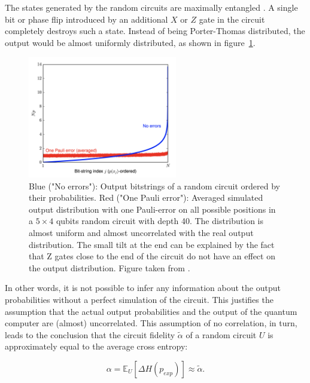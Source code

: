 The states generated by the random circuits are
maximally entangled \cite{Boixo2018supremacy}. A single bit or phase flip introduced by an additional $ X $ or $ Z $ gate in the circuit completely destroys such a state. Instead of being Porter-Thomas distributed, the output would be almost uniformly distributed, as shown in figure~\ref{fig:rcs_noise}.

\begin{figure}[H]
  \centering
  \includegraphics[width=0.58\textwidth]{figures/rcs_noise}
  \caption[Effect of One Pauli-Error on Random Circuits]{Blue ("No errors"): Output bitstrings of a random circuit ordered by their probabilities. Red ("One Pauli error"): Averaged 
  simulated output distribution with one Pauli-error on all possible positions in a $5 \times 4$ qubits random circuit 
  with depth 40. The distribution is almost uniform and almost uncorrelated with the real output distribution. The small tilt at 
  the end can be explained by the fact that Z gates close to the end of the circuit do not have an effect on the output distribution. Figure taken from \cite{Boixo2018supremacy}.}
  \label{fig:rcs_noise}
\end{figure}

In other words, it is not possible to infer any information about the output
probabilities without a perfect simulation of the circuit.
This justifies the assumption that the actual output probabilities and the output
of the quantum computer are (almost) uncorrelated.
This assumption of no correlation, in turn, leads to the conclusion that the
circuit fidelity $\tilde{\alpha}$ of a random
circuit $U$ is approximately equal to the average cross entropy:

\begin{equation}
  \label{eq:extrapolate}
  \alpha = \mathbb{E}_U[\Delta H(p_{exp})] \approx \tilde{\alpha}.
\end{equation}

